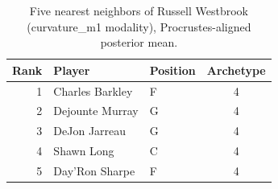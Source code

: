 \begin{table}[htbp]
  \centering\small
  \begin{tabular}{rllc}
    \toprule
    Rank & Player & Position & Archetype \\
    \midrule
    1 & Charles Barkley & F & 4 \\
    2 & Dejounte Murray & G & 4 \\
    3 & DeJon Jarreau & G & 4 \\
    4 & Shawn Long & C & 4 \\
    5 & Day'Ron Sharpe & F & 4 \\
    \bottomrule
  \end{tabular}
  \caption{Five nearest neighbors of Russell Westbrook (curvature_m1 modality), Procrustes-aligned posterior mean.}
  \label{tab:Russell_Westbrook_neighbors_curvature_m1}
\end{table}


